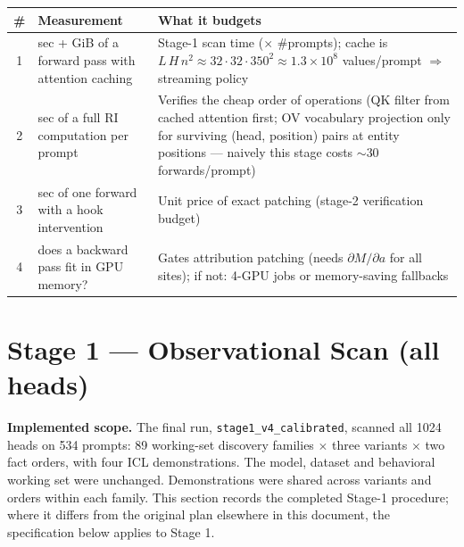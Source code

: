 \documentclass[11pt,a4paper]{article}
\newcommand{\file}[1]{\nolinkurl{#1}}
\begin{document}
\begin{center}\small
\begin{tabular}{clp{7.6cm}}
\toprule
\# & Measurement & What it budgets \\
\midrule
1 & sec + GiB of a forward pass with attention caching & Stage-1 scan time ($\times$ \#prompts); cache is $L\,H\,n^2 \approx 32\cdot 32\cdot 350^2 \approx 1.3\times10^8$ values/prompt $\Rightarrow$ streaming policy \\
2 & sec of a full RI computation per prompt & Verifies the cheap order of operations (QK filter from cached attention first; OV vocabulary projection only for surviving (head, position) pairs at entity positions --- naively this stage costs $\sim$30 forwards/prompt) \\
3 & sec of one forward with a hook intervention & Unit price of exact patching (stage-2 verification budget) \\
4 & does a backward pass fit in GPU memory? & Gates attribution patching (needs $\partial M/\partial a$ for all sites); if not: 4-GPU jobs or memory-saving fallbacks \\
\bottomrule
\end{tabular}
\end{center}

\section{Stage 1 --- Observational Scan (all heads)}
\textbf{Implemented scope.} The final run, \file{stage1_v4_calibrated}, scanned all 1024 heads on 534 prompts: 89 working-set discovery families $\times$ three variants $\times$ two fact orders, with four ICL demonstrations. The model, dataset and behavioral working set were unchanged. Demonstrations were shared across variants and orders within each family. This section records the completed Stage-1 procedure; where it differs from the original plan elsewhere in this document, the specification below applies to Stage 1.
\end{document}
